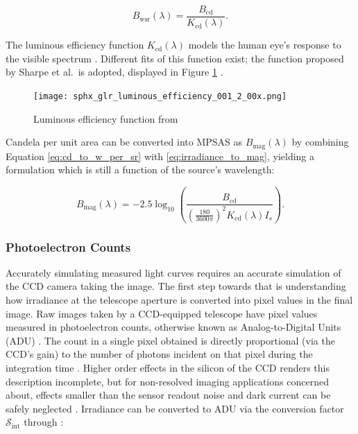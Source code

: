 \begin{equation} \label{eq:cd_to_w_per_sr}
  B_\mathrm{wsr}(\lambda) = \frac{B_\mathrm{cd}}{K_\mathrm{cd}(\lambda)}.
\end{equation}

The luminous efficiency function $K_\mathrm{cd}(\lambda)$ models the human eye's response to the visible spectrum \cite{sharpe2005}. Different fits of this function exist; the function proposed by Sharpe et al.\ is adopted, displayed in Figure \ref{fig:luminous_efficiency} \cite{sharpe2005}.

\begin{figure}[ht]
  \centering
  \texttt{[image: sphx\_glr\_luminous\_efficiency\_001\_2\_00x.png]}
  \caption{Luminous efficiency function from \cite{sharpe2005}}
  \label{fig:luminous_efficiency}
\end{figure}

Candela per unit area can be converted into MPSAS as $B_\mathrm{mag}(\lambda)$ by combining Equation \ref{eq:cd_to_w_per_sr} with \ref{eq:irradiance_to_mag}, yielding a formulation which is still a function of the source's wavelength:

\begin{equation} \label{eq:cd_per_m2_to_mpsas}
  B_\mathrm{mag}(\lambda) = -2.5 \log_{10}\left( \frac{B_\mathrm{cd}}{\left( \frac{180}{ 3600\pi} \right)^2 K_\mathrm{cd}(\lambda) I_s} \right).
\end{equation}

\subsubsection{Photoelectron Counts}

Accurately simulating measured light curves requires an accurate simulation of the CCD camera taking the image. The first step towards that is understanding how irradiance at the telescope aperture is converted into pixel values in the final image. Raw images taken by a CCD-equipped telescope have pixel values measured in photoelectron counts, otherwise known as Analog-to-Digital Units (ADU) \cite{krag2003}. The count in a single pixel obtained is directly proportional (via the CCD's gain) to the number of
photons incident on that pixel during the integration time \cite{krag2003}. Higher order effects in the silicon of
the CCD renders this description incomplete, but for non-resolved imaging applications
concerned about, effects smaller than the sensor readout noise and dark current can be safely neglected
\cite{frueh2019notes}. Irradiance can be converted to ADU via the conversion factor $\mathcal{S}_\mathrm{int}$
through \cite{krag2003}:

